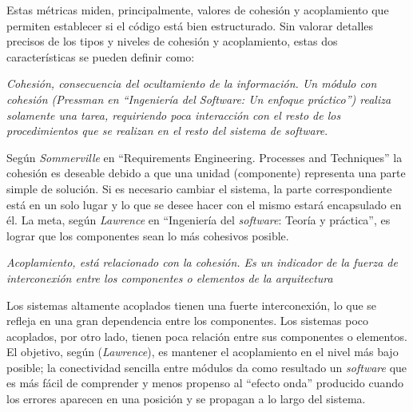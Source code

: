 Estas métricas miden, principalmente, valores de cohesión y acoplamiento que permiten establecer si el código está bien estructurado. 
Sin valorar detalles precisos de los tipos y niveles de cohesión y acoplamiento, estas dos características se pueden definir como:

\begin{Frame}
\textit{Cohesión, consecuencia del ocultamiento de la información. Un módulo con
cohesión (Pressman en ``Ingeniería del Software: Un enfoque práctico'')
realiza solamente una tarea, requiriendo poca
interacción con el resto de los procedimientos que se realizan en el resto del
sistema de software}. 
\end{Frame}

Según \textit{Sommerville} en ``Requirements Engineering. Processes and Techniques'' la cohesión es deseable
debido a que una unidad (componente) representa una parte
simple de solución. Si es necesario cambiar el sistema, la parte
correspondiente está en un solo lugar y lo que se desee hacer con
el mismo estará encapsulado en él. La meta, según \textit{Lawrence} en ``Ingeniería del \textit{software}: Teoría y práctica'', es lograr 
que los componentes sean lo más cohesivos posible.


\begin{Frame}
\textit{Acoplamiento, está relacionado con la cohesión. Es un
indicador de la fuerza de interconexión entre los componentes o
elementos de la arquitectura }
\end{Frame}

Los sistemas altamente acoplados tienen una fuerte interconexión, lo que se
refleja en una gran dependencia entre los componentes. Los
sistemas poco acoplados, por otro lado, tienen poca relación entre
sus componentes o elementos. El objetivo, según (\textit{Lawrence}), es mantener el
acoplamiento en el nivel más bajo posible; la conectividad sencilla entre
módulos da como resultado un \textit{software} que es más fácil de comprender y menos
propenso al ``efecto onda'' producido cuando los errores aparecen en una
posición y se propagan a lo largo del sistema. 


